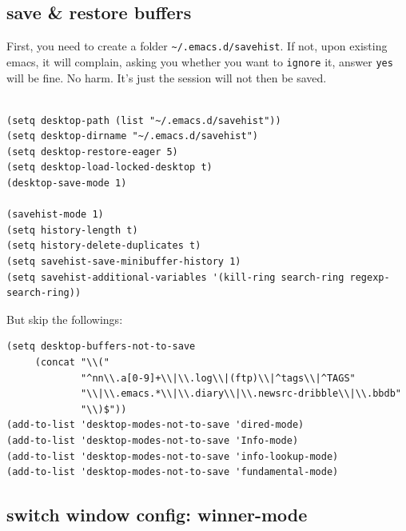 \documentclass[11pt]{article}
\begin{document}
\subsection{save \& restore buffers}
\label{sec:orgc3c44ea}

First, you need to create a folder \texttt{\textasciitilde{}/.emacs.d/savehist}. If not, upon
existing emacs, it will complain, asking you whether you want to
\texttt{ignore} it, answer \texttt{yes} will be fine. No harm. It's just the session
will not then be saved.

\begin{verbatim}

(setq desktop-path (list "~/.emacs.d/savehist"))
(setq desktop-dirname "~/.emacs.d/savehist")
(setq desktop-restore-eager 5)
(setq desktop-load-locked-desktop t)
(desktop-save-mode 1)

(savehist-mode 1)
(setq history-length t)
(setq history-delete-duplicates t)
(setq savehist-save-minibuffer-history 1)
(setq savehist-additional-variables '(kill-ring search-ring regexp-search-ring))

\end{verbatim}

But skip the followings:
\begin{verbatim}
(setq desktop-buffers-not-to-save
     (concat "\\("
             "^nn\\.a[0-9]+\\|\\.log\\|(ftp)\\|^tags\\|^TAGS"
             "\\|\\.emacs.*\\|\\.diary\\|\\.newsrc-dribble\\|\\.bbdb"
             "\\)$"))
(add-to-list 'desktop-modes-not-to-save 'dired-mode)
(add-to-list 'desktop-modes-not-to-save 'Info-mode)
(add-to-list 'desktop-modes-not-to-save 'info-lookup-mode)
(add-to-list 'desktop-modes-not-to-save 'fundamental-mode)
\end{verbatim}

\subsection{switch window config: winner-mode}
\label{sec:orgc728e99}
\end{document}
